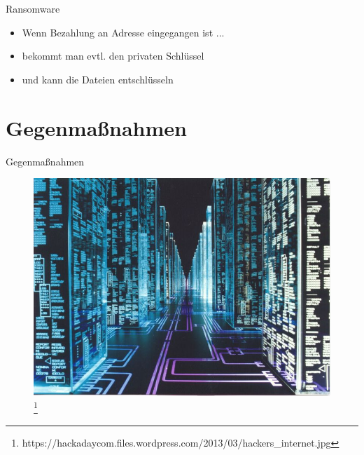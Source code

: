 \documentclass[10pt]{beamer}
\begin{document}
\begin{frame}{Ransomware}
	\begin{itemize}
		\item Wenn Bezahlung an Adresse eingegangen ist ...
		\item bekommt man evtl. den privaten Schlüssel
		\item und kann die Dateien entschlüsseln
	\end{itemize}
\end{frame}


\section{Gegenmaßnahmen}
\begin{frame}{Gegenmaßnahmen}
	\begin{figure}[p]
		\centering
		\includegraphics[scale=0.3]{hackers_internet.jpg}
		\let\thefootnote\relax\footnote{https://hackadaycom.files.wordpress.com/2013/03/hackers\_internet.jpg}
	\end{figure}
\end{frame}
\end{document}
